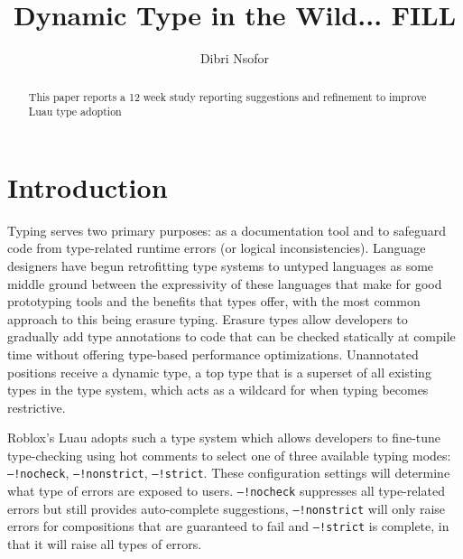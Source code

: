 \documentclass[acmsmall,screen,review,anonymous]{acmart}
\newcommand{\code}[1]{\texttt{#1}}
\begin{document}
\title{Dynamic Type in the Wild... FILL}

\author{Dibri Nsofor}


\begin{abstract}
  This paper reports a 12 week study reporting suggestions and refinement to improve Luau type adoption
\end{abstract}

\maketitle


\section{Introduction}
\label{s:intro}
\label{s:background}
Typing serves two primary purposes: as a documentation tool and to 
safeguard code from type-related runtime errors (or logical inconsistencies). 
Language designers have begun retrofitting type systems to untyped languages as some middle ground between the expressivity 
of these languages that make for good prototyping tools and 
the benefits that types offer, with the most common approach to this being 
erasure typing. Erasure types allow developers to gradually add 
type annotations to code that can be checked statically at compile time without 
offering type-based performance optimizations. Unannotated 
positions receive a dynamic type, a top type that is a superset of 
all existing types in the type system, which acts as a wildcard for
when typing becomes restrictive. 

Roblox's Luau \cite{luau_lang} adopts such a type system which allows developers 
to fine-tune type-checking using hot comments to select one 
of three available typing modes: \code{--!nocheck}, \code{--!nonstrict}, 
\code{--!strict}. These configuration settings will
determine what type of errors are exposed to users. \code{--!nocheck}
suppresses all type-related errors but still provides auto-complete suggestions, 
\code{--!nonstrict} will only raise errors 
for compositions that are guaranteed to fail and \code{--!strict} is complete, 
in that it will raise all types of errors.
\end{document}
